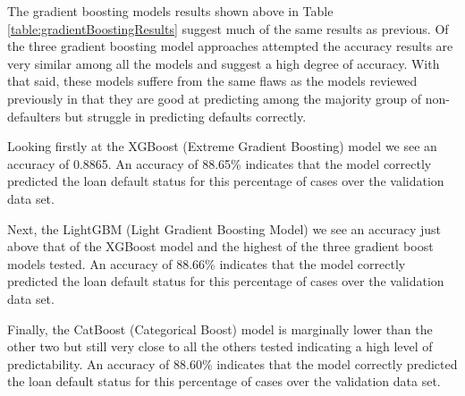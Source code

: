 \documentclass[12pt]{article}
\begin{document}
The gradient boosting models results shown above in Table \ref{table:gradientBoostingResults} suggest much of the same results as previous. Of the three gradient boosting model approaches attempted the accuracy results are very similar among all the models and suggest a high degree of accuracy. With that said, these models suffere from the same flaws as the models reviewed previously in that they are good at predicting among the majority group of non-defaulters but struggle in predicting defaults correctly.

Looking firstly at the XGBoost (Extreme Gradient Boosting) model we see an accuracy of 0.8865. An accuracy of 88.65\% indicates that the model correctly predicted the loan default status for this percentage of cases over the validation data set.

Next, the LightGBM (Light Gradient Boosting Model) we see an accuracy just above that of the XGBoost model and the highest of the three gradient boost models tested. An accuracy of 88.66\% indicates that the model correctly predicted the loan default status for this percentage of cases over the validation data set.

Finally, the CatBoost (Categorical Boost) model is marginally lower than the other two but still very close to all the others tested indicating a high level of predictability. An accuracy of 88.60\% indicates that the model correctly predicted the loan default status for this percentage of cases over the validation data set.
\end{document}
